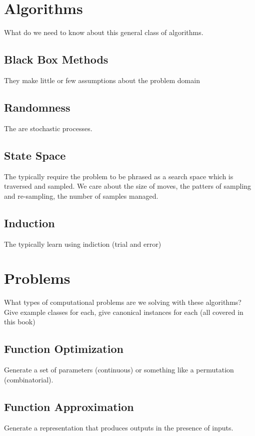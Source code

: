 \section{Algorithms}
What do we need to know about this general class of algorithms.

\subsection{Black Box Methods}
They make little or few assumptions about the problem domain

\subsection{Randomness}
The are stochastic processes.

\subsection{State Space}
The typically require the problem to be phrased as a search space which is traversed and sampled.
We care about the size of moves, the patters of sampling and re-sampling, the number of samples managed.

\subsection{Induction}
The typically learn using indiction (trial and error)



\section{Problems}
What types of computational problems are we solving with these algorithms?
Give example classes for each, give canonical instances for each (all covered in this book)

\subsection{Function Optimization}
Generate a set of parameters (continuous) or something like a permutation (combinatorial).

\subsection{Function Approximation}
Generate a representation that produces outputs in the presence of inputs.



